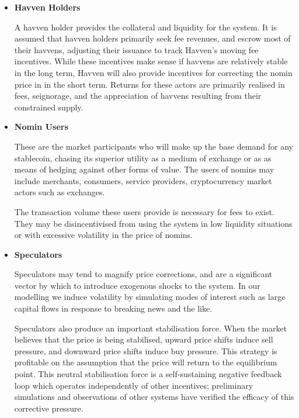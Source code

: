 \begin{itemize}
	\item[] \textbf{Havven Holders}

	A havven holder provides the collateral and liquidity for the system.
	It is assumed that havven holders primarily seek fee revenues, and escrow most of their havvens,
	adjusting their issuance to track Havven's moving fee incentives.
	While these incentives make sense if havvens are relatively stable in the long term,
	Havven will also provide incentives for correcting the nomin price in in the short term.
	Returns for these actors are primarily realised in fees, seignorage, and the appreciation of havvens resulting
	from their constrained supply.

	\item[] \textbf{Nomin Users}

	These are the market participants who will make up the base demand
	for any stablecoin, chasing its superior utility as a medium of exchange or as
	as means of hedging against other forms of value. 
	The users of nomins may include merchants, consumers, service providers, cryptocurrency market actors
	such as exchanges. 
	
	The transaction volume these users provide is necessary for fees to exist.
	They may be disincentivised from using the system in low liquidity situations or with excessive volatility
	in the price of nomins.
	
	\newpage

	\item[] \textbf{Speculators}
	
	Speculators may tend to magnify price corrections, and are a significant vector by which to introduce
	exogenous shocks to the system. In our modelling we induce volatility by simulating modes of interest
	such as large capital flows in response to breaking news and the like.

	Speculators also produce an important stabilisation force. When the market believes that the price is
	being stabilised, upward price shifts induce sell pressure, and downward
	price shifts induce buy pressure. This strategy is profitable on the assumption that the price
	will return to the equilibrium point. This neutral stabilisation force is a self-sustaining
	negative feedback loop which operates independently of other incentives; preliminary simulations and observations of other systems
	have verified the efficacy of this corrective pressure.
	
	

\end{itemize}
